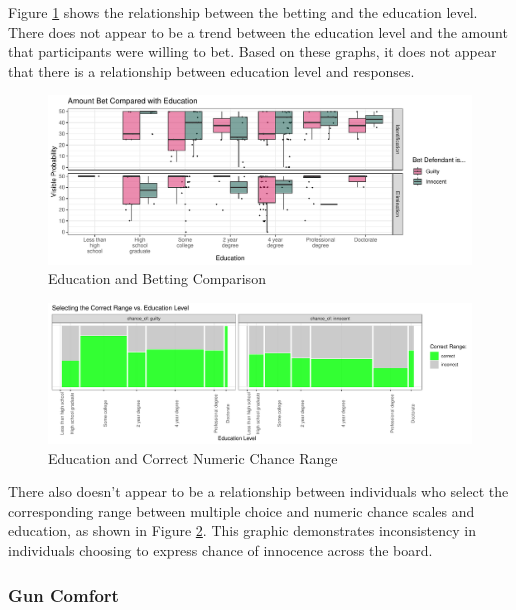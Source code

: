 \documentclass[print]{nuthesis}
\begin{document}
Figure \ref{fig:educbet} shows the relationship between the betting and the education level.
There does not appear to be a trend between the education level and the amount that participants were willing to bet.
Based on these graphs, it does not appear that there is a relationship between education level and responses.

\begin{figure}

{\centering \includegraphics[width=\linewidth]{thesis_files/figure-latex/educbet-1} 

}

\caption{Education and Betting Comparison}\label{fig:educbet}
\end{figure}

\begin{figure}

{\centering \includegraphics[width=\linewidth]{thesis_files/figure-latex/educrange-1} 

}

\caption{Education and Correct Numeric Chance Range}\label{fig:educrange}
\end{figure}

There also doesn't appear to be a relationship between individuals who select the corresponding range between multiple choice and numeric chance scales and education, as shown in Figure \ref{fig:educrange}.
This graphic demonstrates inconsistency in individuals choosing to express chance of innocence across the board.

\hypertarget{gun-comfort}{%
\subsubsection{Gun Comfort}\label{gun-comfort}}
\end{document}
